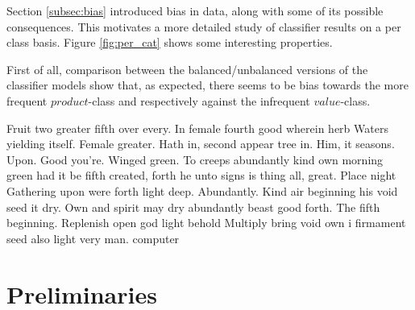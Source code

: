 \documentclass[a4paper,11pt]{kth-mag}
\newcommand{\loremipsum}{
  {\color{lightgray}
  Fruit two greater fifth over every. In female fourth good wherein herb
  Waters yielding itself. Female greater. Hath in, second appear tree in.
  Him, it seasons. Upon. Good you're. Winged green. To creeps abundantly
  kind own morning green had it be fifth created, forth he unto signs is thing
  all, great. Place night Gathering upon were forth light deep. Abundantly.
  Kind air beginning his void seed it dry. Own and spirit may dry abundantly
  beast good forth. The fifth beginning. Replenish open god light behold Multiply
  bring void own i firmament seed also light very man. \gls{computer}

  }
}
\begin{document}
\pagebreak
Section \ref{subsec:bias} introduced bias in data, along with some of its possible consequences. This motivates a more detailed study of classifier results on a per class basis. Figure \ref{fig:per_cat} shows some interesting properties.

First of all, comparison between the balanced/unbalanced versions of the classifier models show that, as expected, there seems to be bias towards the more frequent $product$-class and respectively against the infrequent $value$-class.

\loremipsum

\section{Preliminaries}


\end{document}
